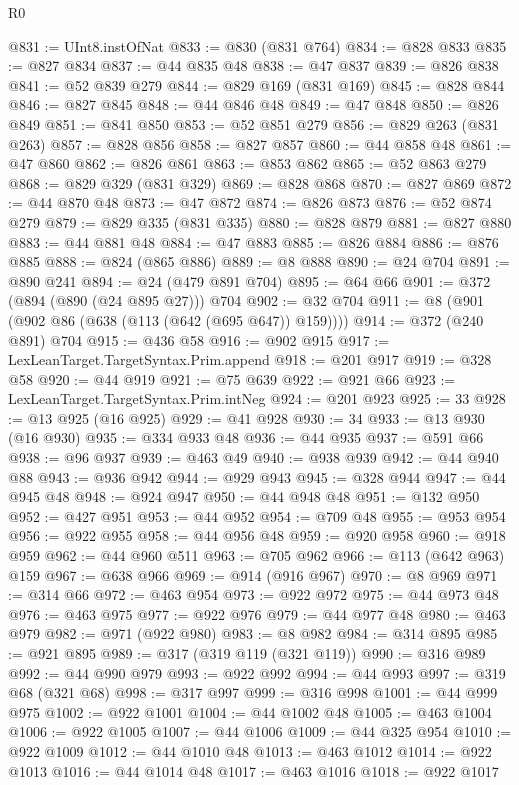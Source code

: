 \begin{lexlean}{R0}
\begin{coremodule}
{{{{{{{{{{{{{{{{{{{{{{{{{{{{{{{{{{{{{{{{{{{{{{{{{{{{{{{{{{{{{{{{{{{{{{{{{@831 := UInt8.instOfNat
@833 := @830 (@831 @764)
@834 := @828 @833
@835 := @827 @834
@837 := @44 @835 @48
@838 := @47 @837
@839 := @826 @838
@841 := @52 @839 @279
@844 := @829 @169 (@831 @169)
@845 := @828 @844
@846 := @827 @845
@848 := @44 @846 @48
@849 := @47 @848
@850 := @826 @849
@851 := @841 @850
@853 := @52 @851 @279
@856 := @829 @263 (@831 @263)
@857 := @828 @856
@858 := @827 @857
@860 := @44 @858 @48
@861 := @47 @860
@862 := @826 @861
@863 := @853 @862
@865 := @52 @863 @279
@868 := @829 @329 (@831 @329)
@869 := @828 @868
@870 := @827 @869
@872 := @44 @870 @48
@873 := @47 @872
@874 := @826 @873
@876 := @52 @874 @279
@879 := @829 @335 (@831 @335)
@880 := @828 @879
@881 := @827 @880
@883 := @44 @881 @48
@884 := @47 @883
@885 := @826 @884
@886 := @876 @885
@888 := @824 (@865 @886)
@889 := @8 @888
@890 := @24 @704
@891 := @890 @241
@894 := @24 (@479 @891 @704)
@895 := @64 @66
@901 := @372 (@894 (@890 (@24 @895 @27))) @704
@902 := @32 @704
@911 := @8 (@901 (@902 @86 (@638 (@113 (@642 (@695 @647)) @159))))
@914 := @372 (@240 @891) @704
@915 := @436 @58
@916 := @902 @915
@917 := LexLeanTarget.TargetSyntax.Prim.append
@918 := @201 @917
@919 := @328 @58
@920 := @44 @919
@921 := @75 @639
@922 := @921 @66
@923 := LexLeanTarget.TargetSyntax.Prim.intNeg
@924 := @201 @923
@925 := 33
@928 := @13 @925 (@16 @925)
@929 := @41 @928
@930 := 34
@933 := @13 @930 (@16 @930)
@935 := @334 @933 @48
@936 := @44 @935
@937 := @591 @66
@938 := @96 @937
@939 := @463 @49
@940 := @938 @939
@942 := @44 @940 @88
@943 := @936 @942
@944 := @929 @943
@945 := @328 @944
@947 := @44 @945 @48
@948 := @924 @947
@950 := @44 @948 @48
@951 := @132 @950
@952 := @427 @951
@953 := @44 @952
@954 := @709 @48
@955 := @953 @954
@956 := @922 @955
@958 := @44 @956 @48
@959 := @920 @958
@960 := @918 @959
@962 := @44 @960 @511
@963 := @705 @962
@966 := @113 (@642 @963) @159
@967 := @638 @966
@969 := @914 (@916 @967)
@970 := @8 @969
@971 := @314 @66
@972 := @463 @954
@973 := @922 @972
@975 := @44 @973 @48
@976 := @463 @975
@977 := @922 @976
@979 := @44 @977 @48
@980 := @463 @979
@982 := @971 (@922 @980)
@983 := @8 @982
@984 := @314 @895
@985 := @921 @895
@989 := @317 (@319 @119 (@321 @119))
@990 := @316 @989
@992 := @44 @990 @979
@993 := @922 @992
@994 := @44 @993
@997 := @319 @68 (@321 @68)
@998 := @317 @997
@999 := @316 @998
@1001 := @44 @999 @975
@1002 := @922 @1001
@1004 := @44 @1002 @48
@1005 := @463 @1004
@1006 := @922 @1005
@1007 := @44 @1006
@1009 := @44 @325 @954
@1010 := @922 @1009
@1012 := @44 @1010 @48
@1013 := @463 @1012
@1014 := @922 @1013
@1016 := @44 @1014 @48
@1017 := @463 @1016
@1018 := @922 @1017
}}}}}}}}}}}}}}}}}}}}}}}}}}}}}}}}}}}}}}}}}}}}}}}}}}}}}}}}}}}}}}}}}}}}}}}}}
\end{coremodule}
\end{lexlean}
